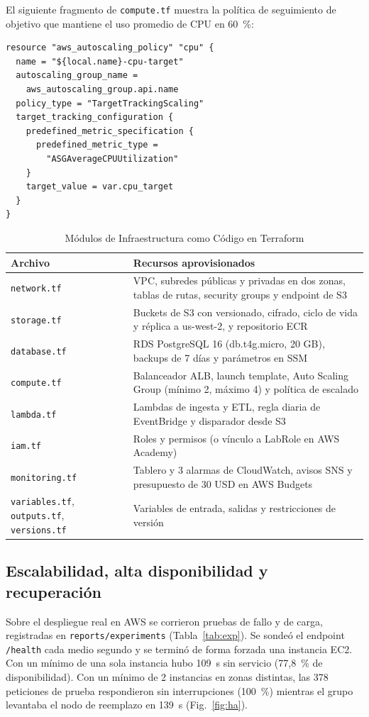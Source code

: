 \documentclass[conference]{IEEEtran}
\begin{document}
El siguiente fragmento de \texttt{compute.tf} muestra la política de seguimiento de objetivo que mantiene el uso promedio de CPU en 60~\%:

{\scriptsize
\begin{verbatim}
resource "aws_autoscaling_policy" "cpu" {
  name = "${local.name}-cpu-target"
  autoscaling_group_name =
    aws_autoscaling_group.api.name
  policy_type = "TargetTrackingScaling"
  target_tracking_configuration {
    predefined_metric_specification {
      predefined_metric_type =
        "ASGAverageCPUUtilization"
    }
    target_value = var.cpu_target
  }
}
\end{verbatim}
}

\begin{table}[t]
\caption{Módulos de Infraestructura como Código en Terraform}
\label{tab:iac}
\centering
\footnotesize
\begin{tabular}{@{}p{1.9cm}p{5.7cm}@{}}
\toprule
Archivo & Recursos aprovisionados \\
\midrule
\texttt{network.tf} & VPC, subredes públicas y privadas en dos zonas, tablas de rutas, security groups y endpoint de S3 \\
\texttt{storage.tf} & Buckets de S3 con versionado, cifrado, ciclo de vida y réplica a us-west-2, y repositorio ECR \\
\texttt{database.tf} & RDS PostgreSQL 16 (db.t4g.micro, 20 GB), backups de 7 días y parámetros en SSM \\
\texttt{compute.tf} & Balanceador ALB, launch template, Auto Scaling Group (mínimo 2, máximo 4) y política de escalado \\
\texttt{lambda.tf} & Lambdas de ingesta y ETL, regla diaria de EventBridge y disparador desde S3 \\
\texttt{iam.tf} & Roles y permisos (o vínculo a LabRole en AWS Academy) \\
\texttt{monitoring.tf} & Tablero y 3 alarmas de CloudWatch, avisos SNS y presupuesto de 30 USD en AWS Budgets \\
\texttt{variables.tf}, \texttt{outputs.tf}, \texttt{versions.tf} & Variables de entrada, salidas y restricciones de versión \\
\bottomrule
\end{tabular}
\end{table}

\subsection{Escalabilidad, alta disponibilidad y recuperación}
Sobre el despliegue real en AWS se corrieron pruebas de fallo y de carga, registradas en \texttt{reports/experiments} (Tabla~\ref{tab:exp}). Se sondeó el endpoint \texttt{/health} cada medio segundo y se terminó de forma forzada una instancia EC2. Con un mínimo de una sola instancia hubo 109~s sin servicio (77,8~\% de disponibilidad). Con un mínimo de 2 instancias en zonas distintas, las 378 peticiones de prueba respondieron sin interrupciones (100~\%) mientras el grupo levantaba el nodo de reemplazo en 139~s (Fig.~\ref{fig:ha}).
\end{document}
